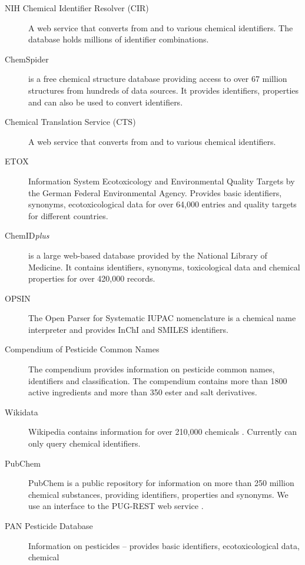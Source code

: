 \documentclass[article]{jss}
\begin{document}
\begin{description}
\item[NIH Chemical Identifier Resolver (CIR)]{\citep{cir} A web
    service that converts from and to various chemical identifiers. The database holds millions of identifier combinations.}
\item[ChemSpider]{\citep{pence_chemspider:_2010} is a free chemical
	structure database providing access to over 67 million
	structures from hundreds of data sources. It provides identifiers, properties and can also be
	used to convert identifiers.}
\item[Chemical Translation Service (CTS)]{
  \citep{Wohlgemuth_Haldiya_Willighagen_Kind_Fiehn_2010} A web
    service that converts from and to various chemical identifiers.}
\item[ETOX]{\citep{etox} Information System Ecotoxicology and
    Environmental Quality Targets by the German Federal Environmental
    Agency. Provides basic identifiers, synonyms, ecotoxicological
    data for over 64,000 entries and quality targets for different countries.}
\item[ChemID\emph{plus}]{\citep{Tomasulo_2002} is a large web-based
	database provided by the National Library of Medicine. It contains
	identifiers, synonyms, toxicological data and chemical
	properties for over 420,000 records.}
\item[OPSIN]{\citep{Lowe_Corbett_Murray-Rust_Glen_2011} The Open
	Parser for Systematic IUPAC nomenclature is a chemical name
	interpreter and provides InChI and SMILES identifiers.}
\item[Compendium of Pesticide Common Names]{\citep{wood} The
	compendium provides information on pesticide common names,
	identifiers and classification. The compendium contains more than 1800 active ingredients and more than 350 ester and salt derivatives. }
\item[Wikidata]{\citep{wiki} Wikipedia contains information for over
	210,000 chemicals
	\citep{Ertl_Patiny_Sander_Rufener_Zasso_2015}. Currently
	 can only query chemical identifiers.}
\item[PubChem]{\citep{Kim_2016} PubChem is a public repository for
    information on more than 250 million chemical substances, providing identifiers,
    properties and synonyms. We use an interface to the PUG-REST web
    service \citep{Kim_Thiessen_Bolton_Bryant_2015}.}
\item[PAN Pesticide Database]{ \citep{pan} Information on pesticides --
	provides basic identifiers, ecotoxicological data, chemical
}
\end{description}
\end{document}
